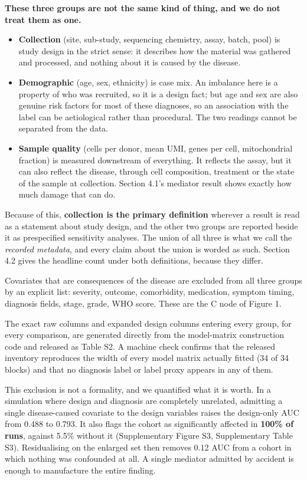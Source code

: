\textbf{These three groups are not the same kind of thing, and we do not treat them as one.}

\begin{itemize}
\tightlist
\item
  \textbf{Collection} (site, sub-study, sequencing chemistry, assay, batch, pool) is study design in the strict sense: it describes how the material was gathered and processed, and nothing about it is caused by the disease.
\item
  \textbf{Demographic} (age, sex, ethnicity) is case mix. An imbalance here is a property of who was recruited, so it is a design fact; but age and sex are also genuine risk factors for most of these diagnoses, so an association with the label can be aetiological rather than procedural. The two readings cannot be separated from the data.
\item
  \textbf{Sample quality} (cells per donor, mean UMI, genes per cell, mitochondrial fraction) is measured downstream of everything. It reflects the assay, but it can also reflect the disease, through cell composition, treatment or the state of the sample at collection. Section 4.1's mediator result shows exactly how much damage that can do.
\end{itemize}

Because of this, \textbf{collection is the primary definition} wherever a result is read as a statement about study design, and the other two groups are reported beside it as prespecified sensitivity analyses. The union of all three is what we call the \emph{recorded metadata}, and every claim about the union is worded as such. Section 4.2 gives the headline count under both definitions, because they differ.

Covariates that are consequences of the disease are excluded from all three groups by an explicit list: severity, outcome, comorbidity, medication, symptom timing, diagnosis fields, stage, grade, WHO score. These are the C node of Figure 1.

The exact raw columns and expanded design columns entering every group, for every comparison, are generated directly from the model-matrix construction code and released as Table S2. A machine check confirms that the released inventory reproduces the width of every model matrix actually fitted (34 of 34 blocks) and that no diagnosis label or label proxy appears in any of them.

This exclusion is not a formality, and we quantified what it is worth. In a simulation where design and diagnosis are completely unrelated, admitting a single disease-caused covariate to the design variables raises the design-only AUC from 0.488 to 0.793. It also flags the cohort as significantly affected in \textbf{100\% of runs}, against 5.5\% without it (Supplementary Figure S3, Supplementary Table S3). Residualising on the enlarged set then removes 0.12 AUC from a cohort in which nothing was confounded at all. A single mediator admitted by accident is enough to manufacture the entire finding.

